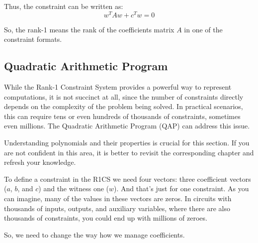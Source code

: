 \documentclass[../lecture-notes.tex]{subfiles}
\begin{document}
Thus, the constraint can be written as:
\[ w^T A w + c^T w = 0 \]

So, the rank-1 means the rank of the coefficients matrix $A$ in one of the constraint formats.

\subsection{Quadratic Arithmetic Program}

While the Rank-1 Constraint System provides a powerful way to represent computations, it is not 
succinct at all, since the number of constraints directly depends on the complexity of the problem
being solved. In practical scenarios, this can require tens or even hundreds of thousands of 
constraints, sometimes even millions. The Quadratic Arithmetic Program (QAP) can address this issue.

\begin{remark}
    Understanding polynomials and their properties is crucial for this section. If you are not 
    confident in this area, it is better to revisit the corresponding chapter and refresh your
    knowledge.
\end{remark}

To define a constraint in the R1CS we need four vectors: three coefficient vectors ($a$, $b$, and
$c$) and the witness one ($w$). And that's just for one constraint. As you can imagine, many of
the values in these vectors are zeros. In circuits with thousands of inputs, outputs, and auxiliary
variables, where there are also thousands of constraints, you could end up with millions of zeroes.

So, we need to change the way how we manage coefficients. 
\end{document}
